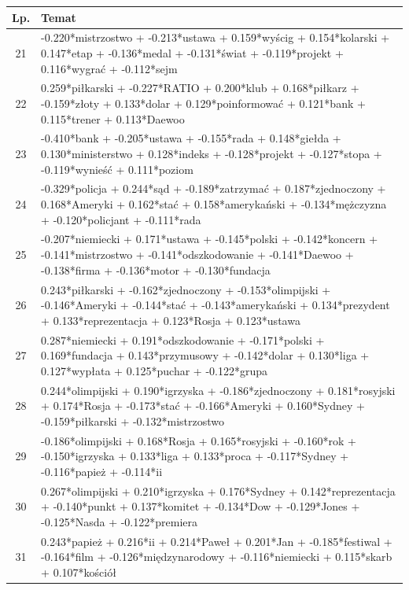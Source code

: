 \documentclass[11pt,a4paper]{article}
\begin{document}
\begin{table}[h]
\begin{tabular}{|c|>{\footnotesize}p{\linewidth}|}
\hline
Lp. & Temat \\\hline

21 & -0.220*mistrzostwo + -0.213*ustawa + 0.159*wyścig + 0.154*kolarski + 0.147*etap + -0.136*medal + -0.131*świat + -0.119*projekt + 0.116*wygrać + -0.112*sejm\\\hline
22 & 0.259*piłkarski + -0.227*RATIO + 0.200*klub + 0.168*piłkarz + -0.159*złoty + 0.133*dolar + 0.129*poinformować + 0.121*bank + 0.115*trener + 0.113*Daewoo\\\hline
23 & -0.410*bank + -0.205*ustawa + -0.155*rada + 0.148*giełda + 0.130*ministerstwo + 0.128*indeks + -0.128*projekt + -0.127*stopa + -0.119*wynieść + 0.111*poziom\\\hline
24 & -0.329*policja + 0.244*sąd + -0.189*zatrzymać + 0.187*zjednoczony + 0.168*Ameryki + 0.162*stać + 0.158*amerykański + -0.134*mężczyzna + -0.120*policjant + -0.111*rada\\\hline
25 & -0.207*niemiecki + 0.171*ustawa + -0.145*polski + -0.142*koncern + -0.141*mistrzostwo + -0.141*odszkodowanie + -0.141*Daewoo + -0.138*firma + -0.136*motor + -0.130*fundacja\\\hline
26 & 0.243*piłkarski + -0.162*zjednoczony + -0.153*olimpijski + -0.146*Ameryki + -0.144*stać + -0.143*amerykański + 0.134*prezydent + 0.133*reprezentacja + 0.123*Rosja + 0.123*ustawa\\\hline
27 & 0.287*niemiecki + 0.191*odszkodowanie + -0.171*polski + 0.169*fundacja + 0.143*przymusowy + -0.142*dolar + 0.130*liga + 0.127*wypłata + 0.125*puchar + -0.122*grupa\\\hline
28 & 0.244*olimpijski + 0.190*igrzyska + -0.186*zjednoczony + 0.181*rosyjski + 0.174*Rosja + -0.173*stać + -0.166*Ameryki + 0.160*Sydney + -0.159*piłkarski + -0.132*mistrzostwo\\\hline
29 & -0.186*olimpijski + 0.168*Rosja + 0.165*rosyjski + -0.160*rok + -0.150*igrzyska + 0.133*liga + 0.133*proca + -0.117*Sydney + -0.116*papież + -0.114*ii\\\hline
30 & 0.267*olimpijski + 0.210*igrzyska + 0.176*Sydney + 0.142*reprezentacja + -0.140*punkt + 0.137*komitet + -0.134*Dow + -0.129*Jones + -0.125*Nasda + -0.122*premiera\\\hline
31 & 0.243*papież + 0.216*ii + 0.214*Paweł + 0.201*Jan + -0.185*festiwal + -0.164*film + -0.126*międzynarodowy + -0.116*niemiecki + 0.115*skarb + 0.107*kościół\\\hline

\end{tabular}
\end{table}
\end{document}
